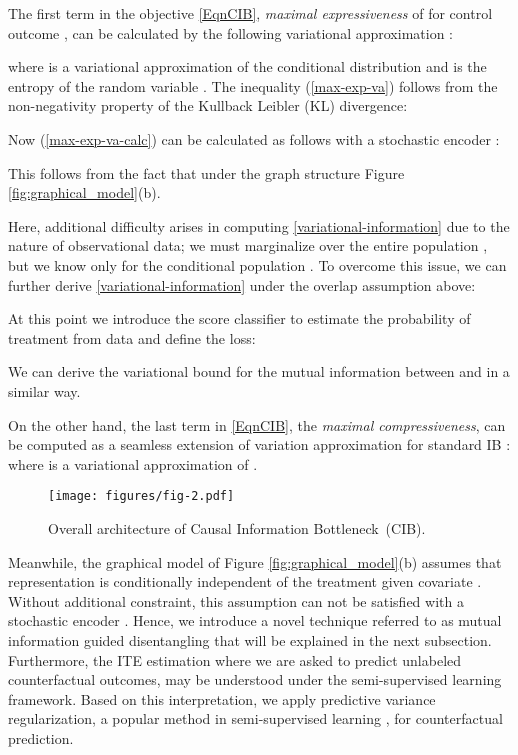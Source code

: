 \documentclass{article}
\begin{document}
    


    The first term in the objective \eqref{EqnCIB}, \textit{maximal expressiveness} of  for control outcome , can be calculated by the following variational approximation \cite{Alemi17}:
    
    where  is a variational approximation of the conditional distribution  and  is the entropy of the random variable . The inequality (\ref{max-exp-va}) follows from the non-negativity property of the Kullback Leibler (KL) divergence:
    
    Now (\ref{max-exp-va-calc}) can be calculated as follows with a stochastic encoder :
    
    This follows from the fact that  under the graph structure Figure \ref{fig:graphical_model}(b).  
    
    Here, additional difficulty arises in computing \eqref{variational-information} due to the nature of observational data; we must marginalize  over the entire population , but we know  only for the conditional population .
    To overcome this issue, we can further derive \eqref{variational-information} under the overlap assumption  above:
    
At this point we introduce the score classifier  to estimate the probability of treatment from data and define the loss:
    
    We can derive the variational bound for the mutual information between  and  in a similar way.



    On the other hand, the last term in \eqref{EqnCIB}, the \emph{maximal compressiveness}, can be computed as a seamless extension of variation approximation for standard IB \cite{Alemi17}: 
where  is a variational approximation of . 



    \begin{figure}
        \centering
        \texttt{[image: figures/fig-2.pdf]}
        \caption{Overall architecture of Causal Information Bottleneck~(CIB). }\label{fig:network_architecure}
    \end{figure}
    
    Meanwhile, the graphical model of Figure \ref{fig:graphical_model}(b) assumes that representation  is conditionally independent of the treatment  given covariate . Without additional constraint, this assumption can not be satisfied with a stochastic encoder . Hence, we introduce a novel technique referred to as mutual information guided disentangling that will be explained in the next subsection.  Furthermore, the ITE estimation where we are asked to predict unlabeled counterfactual outcomes, may be understood under the  semi-supervised learning framework. Based on this interpretation, we apply predictive variance regularization, a popular method in semi-supervised learning \cite{jean2018semi}, for counterfactual prediction. 
\end{document}
